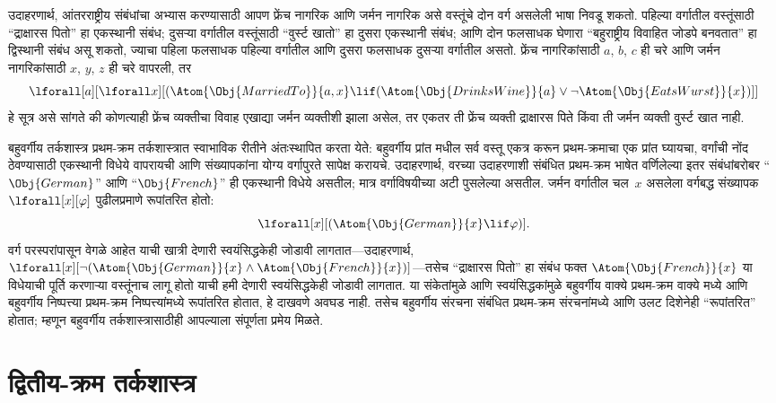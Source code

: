 उदाहरणार्थ, आंतरराष्ट्रीय संबंधांचा अभ्यास करण्यासाठी आपण फ्रेंच नागरिक आणि
जर्मन नागरिक असे वस्तूंचे दोन वर्ग असलेली भाषा निवडू शकतो. पहिल्या वर्गातील
वस्तूंसाठी ``द्राक्षारस पितो'' हा एकस्थानी संबंध; दुसऱ्या वर्गातील वस्तूंसाठी
``वुर्स्ट खातो'' हा दुसरा एकस्थानी संबंध; आणि दोन फलसाधक घेणारा ``बहुराष्ट्रीय
विवाहित जोडपे बनवतात'' हा द्विस्थानी संबंध असू शकतो, ज्याचा पहिला फलसाधक
पहिल्या वर्गातील आणि दुसरा फलसाधक दुसऱ्या वर्गातील असतो. फ्रेंच नागरिकांसाठी
$a$, $b$, $c$ ही चरे आणि जर्मन नागरिकांसाठी $x$, $y$, $z$ ही चरे वापरली, तर
\[\lforall[a][\lforall x][(\Atom{\Obj{MarriedTo}}{a,x} \lif
(\Atom{\Obj{DrinksWine}}{a} \lor \lnot \Atom{\Obj{EatsWurst}}{x})]]
\]
हे सूत्र असे सांगते की कोणत्याही फ्रेंच व्यक्तीचा विवाह एखाद्या जर्मन
व्यक्तीशी झाला असेल, तर एकतर ती फ्रेंच व्यक्ती द्राक्षारस पिते किंवा ती जर्मन
व्यक्ती वुर्स्ट खात नाही.

बहुवर्गीय तर्कशास्त्र प्रथम-क्रम तर्कशास्त्रात स्वाभाविक रीतीने अंतःस्थापित
करता येते: बहुवर्गीय प्रांत मधील सर्व वस्तू एकत्र करून प्रथम-क्रमाचा एक
प्रांत घ्यायचा, वर्गांची नोंद ठेवण्यासाठी एकस्थानी विधेये
वापरायची आणि संख्यापकांना योग्य वर्गापुरते सापेक्ष करायचे. उदाहरणार्थ, वरच्या
उदाहरणाशी संबंधित प्रथम-क्रम भाषेत वर्णिलेल्या इतर संबंधांबरोबर
``$\Obj{German}$'' आणि ``$\Obj{French}$'' ही एकस्थानी विधेये असतील;
मात्र वर्गाविषयीच्या अटी पुसलेल्या असतील. जर्मन वर्गातील चल~$x$
असलेला वर्गबद्ध संख्यापक $\lforall[x][\varphi]$ पुढीलप्रमाणे रूपांतरित होतो:
\[\lforall[x][(\Atom{\Obj{German}}{x} \lif \varphi)].
\]
वर्ग परस्परांपासून वेगळे आहेत याची खात्री देणारी स्वयंसिद्धकेही जोडावी
लागतात---उदाहरणार्थ,
$\lforall[x][\lnot (\Atom{\Obj{German}}{x} \land
  \Atom{\Obj{French}}{x})]$---तसेच ``द्राक्षारस पितो'' हा संबंध फक्त
$\Atom{\Obj{French}}{x}$ या विधेयाची पूर्ति करणाऱ्या वस्तूंनाच लागू होतो
याची हमी देणारी स्वयंसिद्धकेही जोडावी लागतात. या संकेतांमुळे आणि
स्वयंसिद्धकांमुळे बहुवर्गीय वाक्ये प्रथम-क्रम वाक्ये मध्ये आणि
बहुवर्गीय निष्पत्त्या प्रथम-क्रम निष्पत्त्यांमध्ये रूपांतरित होतात,
हे दाखवणे अवघड नाही. तसेच बहुवर्गीय संरचना संबंधित प्रथम-क्रम
संरचनांमध्ये आणि उलट दिशेनेही ``रूपांतरित'' होतात; म्हणून बहुवर्गीय
तर्कशास्त्रासाठीही आपल्याला संपूर्णता प्रमेय मिळते.












\section{द्वितीय-क्रम तर्कशास्त्र}\label{fol:byd:sol:sec}

